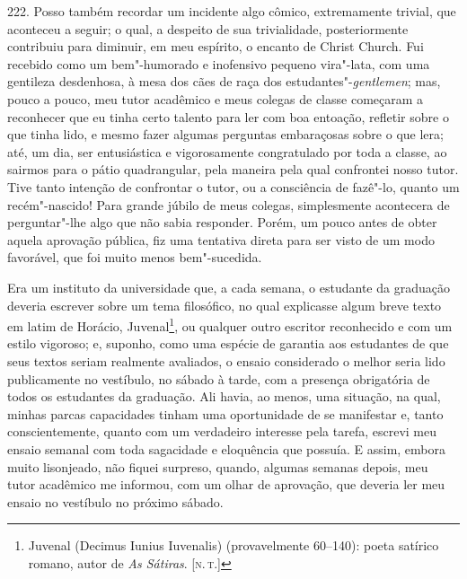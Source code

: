 222. Posso também recordar um incidente algo cômico, extremamente
trivial, que aconteceu a seguir; o qual, a despeito de sua trivialidade,
posteriormente contribuiu para diminuir, em meu espírito, o encanto de
Christ Church. Fui recebido como um bem"-humorado e inofensivo pequeno
vira"-lata, com uma gentileza desdenhosa, à mesa dos cães de raça dos
estudantes"-\emph{gentlemen}; mas, pouco a pouco, meu tutor acadêmico e
meus colegas de classe começaram a reconhecer que eu tinha certo talento
para ler com boa entoação, refletir sobre o que tinha lido, e mesmo
fazer algumas perguntas embaraçosas sobre o que lera; até, um dia, ser
entusiástica e vigorosamente congratulado por toda a classe, ao sairmos
para o pátio quadrangular, pela maneira pela qual confrontei nosso
tutor. Tive tanto intenção de confrontar o tutor, ou a consciência de
fazê"-lo, quanto um recém"-nascido! Para grande júbilo de meus colegas,
simplesmente acontecera de perguntar"-lhe algo que não sabia responder.
Porém, um pouco antes de obter aquela aprovação pública, fiz uma
tentativa direta para ser visto de um modo favorável, que foi muito
menos bem"-sucedida.

Era um instituto da universidade que, a cada semana, o estudante da
graduação deveria escrever sobre um tema filosófico, no qual explicasse
algum breve texto em latim de Horácio, Juvenal\footnote{Juvenal (Decimus
  Iunius Iuvenalis) (provavelmente 60--140): poeta satírico romano, autor
  de \emph{As Sátiras}. {[}\textsc{n.\,t.}{]}}, ou qualquer outro escritor
reconhecido e com um estilo vigoroso; e, suponho, como uma espécie de
garantia aos estudantes de que seus textos seriam realmente avaliados, o
ensaio considerado o melhor seria lido publicamente no vestíbulo, no
sábado à tarde, com a presença obrigatória de todos os estudantes da
graduação. Ali havia, ao menos, uma situação, na qual, minhas parcas
capacidades tinham uma oportunidade de se manifestar e, tanto
conscientemente, quanto com um verdadeiro interesse pela tarefa, escrevi
meu ensaio semanal com toda sagacidade e eloquência que possuía. E
assim, embora muito lisonjeado, não fiquei surpreso, quando, algumas
semanas depois, meu tutor acadêmico me informou, com um olhar de
aprovação, que deveria ler meu ensaio no vestíbulo no próximo sábado.

